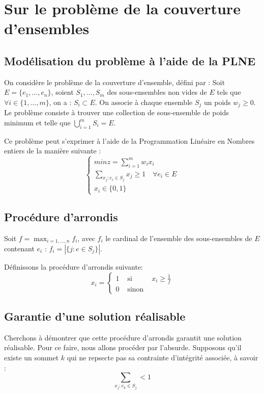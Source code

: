 \section{Sur le problème de la couverture d'ensembles}

\subsection{Modélisation du problème à l'aide de la PLNE}

On considère le problème de la couverture d'ensemble, défini par :
Soit $E = \lbrace e_1, \dots, e_n \rbrace$, soient $S_1, \dots, S_m$ des sous-ensembles non vides
de $E$ tels que $\forall i \in \{1, \dots, m\}$, on a : $S_i \subset E$. On associe à chaque
ensemble $S_j$ un poids $w_j \geq 0$. Le problème consiste à trouver une collection de sous-ensemble
de poids minimum et telle que $\bigcup_{i=1}^m S_i = E$.

Ce problème peut s'exprimer à l'aide de la Programmation Linéaire en Nombres entiers de la manière
suivante : $$
\left \lbrace
\begin{array}{l}
	min z = \sum_{i=1}^m w_ix_i \\
	\sum_{x_j : e_i \in S_j} x_j \geq 1 \quad \forall e_i \in E \\
	x_i \in \{0, 1\}
\end{array} \right.
$$

\subsection{Procédure d'arrondis}

Soit $f = \max_{i=1,\dots,n} f_i$, avec $f_i$ le cardinal de l'ensemble des sous-ensembles de $E$
contenant $e_i$ : $ f_i = |\{j : e \in S_j\}|$.

Définissons la procédure d'arrondis suivante: $$
x_i = \left \{ \begin{array}{rcl}
		1 & \mbox{ si } & x_i \geq \frac{1}{f} \\
		0 & \mbox{ sinon } &
	\end{array} \right .
	$$

\subsection{Garantie d'une solution réalisable}
Cherchons à démontrer que cette procédure d'arrondis garantit une solution réalisable. Pour ce
faire, nous allons procéder par l'absurde. Supposons qu'il existe un sommet $k$ qui ne repsecte pas
sa contrainte d'intégrité associée, à savoir : $$
\sum_{x_j : e_k \in S_j} < 1 $$

